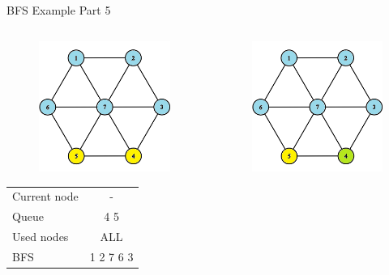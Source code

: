 \documentclass[aspectratio=169]{beamer}%
\begin{document}
\begin{frame}{BFS Example Part 5}
\begin{columns}
\begin{column}{0.32\textwidth}
\begin{figure}[!ht]
                \includegraphics[width=0.9\linewidth]{bfs 14.png}
            \end{figure}
            \begin{table}[ht]
                \centering
                \begin{tabular}{l c}
                    Current node & -\\
                    Queue & 4 5\\ 
                    Used nodes & ALL\\
                    BFS & 1 2 7 6 3
                \end{tabular}
            \end{table}
        \end{column}
        \hfill
        \begin{column}{0.32\textwidth}
            \begin{figure}[!ht]
                \centering
                \includegraphics[width=0.9\linewidth]{bfs 15.png}

\end{figure}
\end{column}
\end{columns}
\end{frame}
\end{document}
